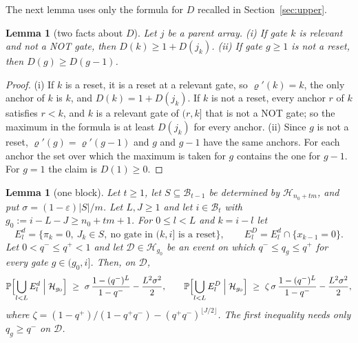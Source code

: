 \documentclass[11pt]{amsart}
\newtheorem{lemma}[theorem]{Lemma}
\theoremstyle{definition}
\theoremstyle{remark}
\newcommand{\eps}{\varepsilon}
\newcommand{\PP}{\mathbb{P}}
\begin{document}
The next lemma uses only the formula for $D$ recalled in Section~\ref{sec:upper}.

\begin{lemma}[two facts about $D$]\label{lem:Dfacts}
Let $j$ be a parent array. (i) If gate $k$ is relevant and not a NOT gate, then
$D(k)\ge1+D(j_k)$. (ii) If gate $g\ge1$ is not a reset, then $D(g)\ge D(g-1)$.
\end{lemma}

\begin{proof}
(i) If $k$ is a reset, it is a reset at a relevant gate, so $\varrho'(k)=k$, the only anchor of $k$
is $k$, and $D(k)=1+D(j_k)$. If $k$ is not a reset, every anchor $r$ of $k$ satisfies $r<k$, and
$k$ is a relevant gate of $(r,k]$ that is not a NOT gate; so the maximum in the formula is at least
$D(j_k)$ for every anchor. (ii) Since $g$ is not a reset, $\varrho'(g)=\varrho'(g-1)$ and $g$ and
$g-1$ have the same anchors. For each anchor the set over which the maximum is taken for $g$
contains the one for $g-1$. For $g=1$ the claim is $D(1)\ge0$.
\end{proof}

\begin{lemma}[one block]\label{lem:oneblock}
Let $t\ge1$, let $S\subseteq\mathcal B_{t-1}$ be determined by $\mathcal H_{n_0+tm}$, and put
$\sigma=(1-\eps)|S|/m$. Let $L,J\ge1$ and let $i\in\mathcal B_t$ with $g_0:=i-L-J\ge n_0+tm+1$. For
$0\le l<L$ and $k=i-l$ let
\[
E^{d}_l=\{\pi_k=0,\ J_k\in S,\ \text{no gate in }(k,i]\text{ is a reset}\},\qquad
E^{D}_l=E^{d}_l\cap\{x_{k-1}=0\}.
\]
Let $0<q^-\le q^+<1$ and let $\mathcal D\in\mathcal H_{g_0}$ be an event on which
$q^-\le q_g\le q^+$ for every gate $g\in(g_0,i]$. Then, on $\mathcal D$,
\[
\PP\Bigl[\bigcup_{l<L}E^{d}_l\Bigm|\mathcal H_{g_0}\Bigr]\ \ge\ \sigma\,\frac{1-(q^-)^L}{1-q^-}-\frac{L^2\sigma^2}{2},
\qquad
\PP\Bigl[\bigcup_{l<L}E^{D}_l\Bigm|\mathcal H_{g_0}\Bigr]\ \ge\ \zeta\,\sigma\,\frac{1-(q^-)^L}{1-q^-}-\frac{L^2\sigma^2}{2},
\]
where $\zeta=(1-q^+)/(1-q^+q^-)-(q^+q^-)^{\lfloor J/2\rfloor}$. The first inequality needs only
$q_g\ge q^-$ on $\mathcal D$.
\end{lemma}
\end{document}
